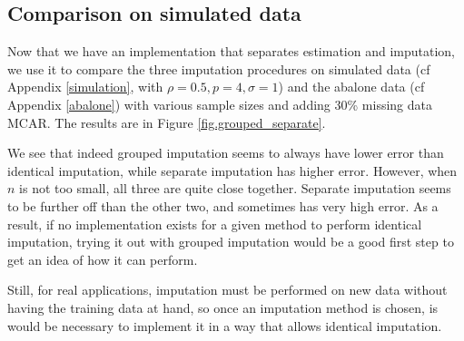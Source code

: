 		\subsection{Comparison on simulated data}
Now that we have an implementation that separates estimation and imputation, we use it to compare the three imputation procedures on simulated data (cf Appendix \ref{simulation}, with $\rho=0.5, p=4, \sigma=1$) and the abalone data (cf Appendix \ref{abalone}) with various sample sizes and adding 30\% missing data MCAR.  The results are in Figure \ref{fig.grouped_separate}.


	
We see that indeed grouped imputation seems to always have lower error than identical imputation, while separate imputation has higher error. However, when $n$ is not too small, all three are quite close together. Separate imputation seems to be further off than the other two, and sometimes has very high error. As a result, if no implementation exists for a given method to perform identical imputation, trying it out with grouped imputation would be a good first step to get an idea of how it can perform.

Still, for real applications, imputation must be performed on new data without having the training data at hand, so once an imputation method is chosen, is would be necessary to implement it in a way that allows identical imputation.